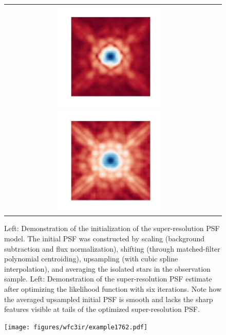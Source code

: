 \begin{figure}
 \begin{tabular}{cc}
\includegraphics[width=0.5\textwidth]{figures/wfc3ir/super0.png}
\includegraphics[width=0.5\textwidth]{figures/wfc3ir/super2.png}
\end{tabular}
\caption{\label{fig:srpsf} Left: Demonstration of the initialization of the super-resolution PSF model. The initial PSF was constructed by scaling (background subtraction and flux normalization), shifting (through matched-filter polynomial centroiding), upsampling (with cubic spline interpolation), and averaging the isolated stars in the observation sample. 
Left: Demonstration of the super-resolution PSF estimate after optimizing the likelihood function with six iterations. Note how the averaged upsampled initial PSF is smooth and lacks the sharp features visible at tails of the optimized super-resolution PSF.}
\end{figure}

\begin{figure}
\texttt{[image: figures/wfc3ir/example1762.pdf]}
\caption{\label{fig:validation_1} }
\end{figure}

